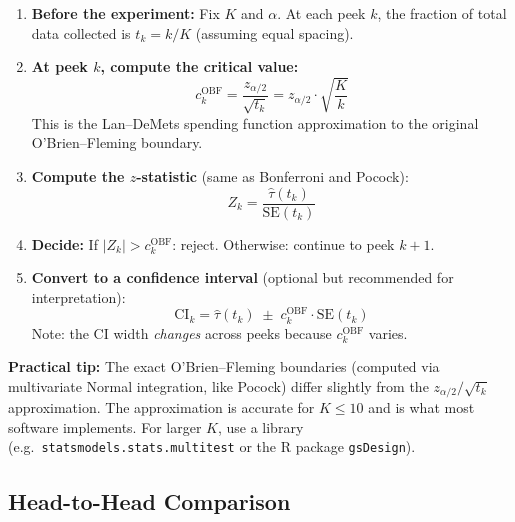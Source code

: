 \documentclass[12pt, a4paper]{article}
\begin{document}
\begin{enumerate}
  \item \textbf{Before the experiment:} Fix $K$ and $\alpha$.  At each peek
        $k$, the fraction of total data collected is
        $t_k = k / K$ (assuming equal spacing).

  \item \textbf{At peek $k$, compute the critical value:}
  \[
    c_k^{\text{OBF}} = \frac{z_{\alpha/2}}{\sqrt{t_k}}
    = z_{\alpha/2} \cdot \sqrt{\frac{K}{k}}
  \]
  This is the Lan--DeMets spending function approximation to the original
  O'Brien--Fleming boundary.

  \item \textbf{Compute the $z$-statistic} (same as Bonferroni and Pocock):
  \[
    Z_k = \frac{\hat{\tau}(t_k)}{\text{SE}(t_k)}
  \]

  \item \textbf{Decide:}
  If $|Z_k| > c_k^{\text{OBF}}$: reject.  Otherwise: continue to peek $k+1$.

  \item \textbf{Convert to a confidence interval} (optional but recommended
        for interpretation):
  \[
    \text{CI}_k = \hat{\tau}(t_k) \;\pm\; c_k^{\text{OBF}} \cdot
    \text{SE}(t_k)
  \]
  Note: the CI width \emph{changes} across peeks because $c_k^{\text{OBF}}$
  varies.
\end{enumerate}

\begin{plainlanguage}
\textbf{Practical tip:}
The exact O'Brien--Fleming boundaries (computed via multivariate Normal
integration, like Pocock) differ slightly from the $z_{\alpha/2}/\sqrt{t_k}$
approximation.  The approximation is accurate for $K \leq 10$ and is what
most software implements.  For larger $K$, use a library
(e.g.\ \texttt{statsmodels.stats.multitest} or the R package \texttt{gsDesign}).
\end{plainlanguage}


\subsection{Head-to-Head Comparison}
\end{document}
